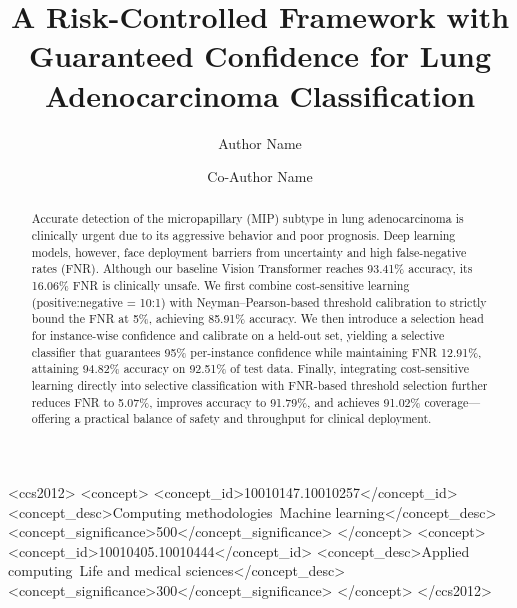 \documentclass[sigconf,review,anonymous]{acmart}
\theoremstyle{remark}
\begin{document}
\title[Risk-Controlled Lung Cancer Classification]{A Risk-Controlled Framework with Guaranteed Confidence for Lung Adenocarcinoma Classification}

\author{Author Name}

\author{Co-Author Name}

\begin{abstract}
Accurate detection of the micropapillary (MIP) subtype in lung adenocarcinoma is clinically urgent due to its aggressive behavior and poor prognosis. Deep learning models, however, face deployment barriers from uncertainty and high false-negative rates (FNR). Although our baseline Vision Transformer reaches 93.41\% accuracy, its 16.06\% FNR is clinically unsafe. We first combine cost-sensitive learning (positive:negative = 10:1) with Neyman--Pearson-based threshold calibration to strictly bound the FNR at 5\%, achieving 85.91\% accuracy. We then introduce a selection head for instance-wise confidence and calibrate on a held-out set, yielding a selective classifier that guarantees 95\% per-instance confidence while maintaining FNR 12.91\%, attaining 94.82\% accuracy on 92.51\% of test data. Finally, integrating cost-sensitive learning directly into selective classification with FNR-based threshold selection further reduces FNR to 5.07\%, improves accuracy to 91.79\%, and achieves 91.02\% coverage---offering a practical balance of safety and throughput for clinical deployment.
\end{abstract}


\begin{CCSXML}
<ccs2012>
   <concept>
       <concept_id>10010147.10010257</concept_id>
       <concept_desc>Computing methodologies~Machine learning</concept_desc>
       <concept_significance>500</concept_significance>
   </concept>
   <concept>
       <concept_id>10010405.10010444</concept_id>
       <concept_desc>Applied computing~Life and medical sciences</concept_desc>
       <concept_significance>300</concept_significance>
   </concept>
</ccs2012>
\end{CCSXML}
\end{document}
